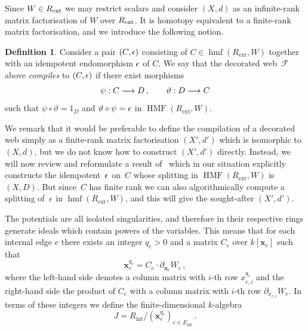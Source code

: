 \documentclass{compositio}
\theoremstyle{definition}
\newtheorem{definition}[theorem]{Definition}
\numberwithin{equation}{section}
\begin{document}
Since $W \in R_{\text{ext}}$ we may restrict scalars and consider $(X,d)$ as an infinite-rank matrix factorisation of $W$ over $R_{\text{ext}}$. It is homotopy equivalent to a finite-rank matrix factorisation, and we introduce the following notion.

\begin{definition} Consider a pair $(C, \epsilon)$ consisting of $C\in\operatorname{hmf}(R_{\text{ext}},W)$ together with an idempotent endomorphism $\epsilon$ of $C$. We say that the decorated web~$\mathcal F$ above \emph{compiles} to $(C,\epsilon)$ if there exist morphisms
\[
\psi: C \longrightarrow D \, , \qquad \vartheta: D \longrightarrow C
\]
such that $\psi \circ \vartheta = 1_{D}$ and $\vartheta \circ \psi = \epsilon$ in $\operatorname{HMF}(R_{\text{ext}},W)$.
\end{definition}

We remark that it would be preferable to define the compilation of a decorated web simply as a finite-rank matrix factorisation $(X',d')$ which is isomorphic to $(X,d)$, but we do not know how to construct $(X',d')$ directly. Instead, we will now review and reformulate a result of~\cite{dm1102.2957} which in our situation explicitly constructs the idempotent~$\epsilon$ on~$C$ whose splitting in $\operatorname{HMF}(R_{\text{ext}},W)$ is $(X,D)$. But since~$C$ has finite rank we can also algorithmically compute a splitting of~$\epsilon$ in $\operatorname{hmf}(R_{\text{ext}},W)$, and this will give the sought-after $(X',d')$. 

The potentials are all isolated singularities, and therefore in their respective rings generate ideals which contain powers of the variables. This means that for each internal edge $e$ there exists an integer $q_e > 0$ and a matrix $C_e$ over $k[\boldsymbol{x}_e]$ such that
\begin{equation}\label{eq:defnqsweb}
\boldsymbol{x}_e^{q_e} = C_e \cdot \partial_{\boldsymbol{x}_e} W_e \, ,
\end{equation}
where the left-hand side denotes a column matrix with $i$-th row $x_{e, i}^{q_e}$ and the right-hand side the product of $C_e$ with a column matrix with $i$-th row $\partial_{x_{e,i}} W_e$. In terms of these integers we define the finite-dimensional $k$-algebra
$$
J = R_{\text{int}}/(\boldsymbol{x}_{e}^{q_{e}})_{e\in E_{\text{int}}} \, .
$$
\end{document}
